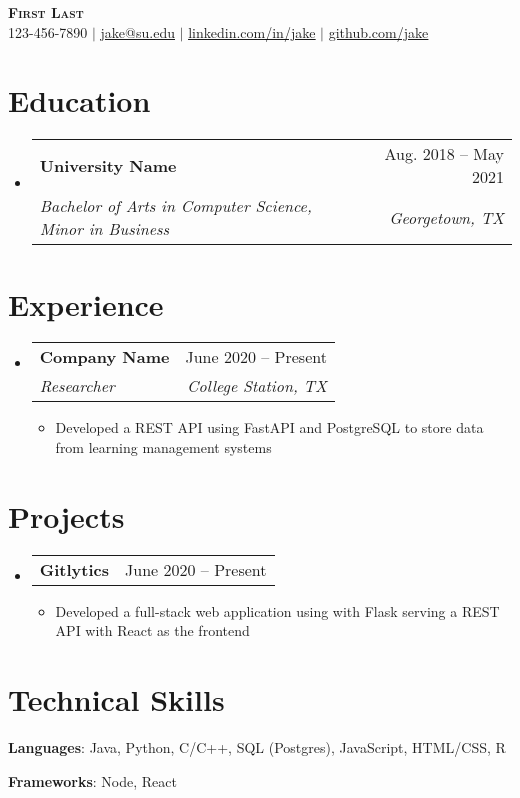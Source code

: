 \documentclass[letterpaper,12pt]{extarticle}
\makeatletter
\newcommand{\resumeItem}[1]{
  \item\small{
    {#1 \vspace{-2pt}}
  }
}
\newcommand{\resumeSubheading}[4]{
  \vspace{-1pt}\item
    \begin{tabular*}{0.97\textwidth}[t]{l@{\extracolsep{\fill}}r}
      \textbf{#1} & \footnotesize #2 \\
      \textit{\small #3} & \textit{\footnotesize #4} \\
    \end{tabular*}\vspace{-7pt}
}
\newcommand{\resumeProjectHeading}[2]{
    \item
    \begin{tabular*}{0.97\textwidth}{l@{\extracolsep{\fill}}r}
      \textbf{#1} & \small #2 \\
    \end{tabular*}\vspace{-7pt}
}
\newcommand{\resumeSubHeadingListStart}{\begin{itemize}[leftmargin=0.15in, label={}]}
\newcommand{\resumeSubHeadingListEnd}{\end{itemize}}
\newcommand{\resumeItemListStart}{
    \begin{itemize}
    \itemsep 2pt
}
\newcommand{\resumeItemListEnd}{\end{itemize}\vspace{-5pt}}
\makeatother
\begin{document}
\begin{center}
	\textbf{\Huge \scshape First Last} \\ \vspace{1pt}
	\small 123-456-7890 $|$ \href{mailto:x@x.com}{\underline{jake@su.edu}} $|$
	\href{https://linkedin.com/in/...}{\underline{linkedin.com/in/jake}} $|$
	\href{https://github.com/...}{\underline{github.com/jake}}
\end{center}


\section{Education}
\resumeSubHeadingListStart
\resumeSubheading
{University Name}{Aug. 2018 -- May 2021}
{Bachelor of Arts in Computer Science, Minor in Business}{Georgetown, TX}
\resumeSubHeadingListEnd

\section{Experience}
\resumeSubHeadingListStart
\resumeSubheading
{Company Name}{June 2020 -- Present}
{Researcher}{College Station, TX}
\resumeItemListStart
\resumeItem{Developed a REST API using FastAPI and PostgreSQL to store data from learning management systems}
\resumeItemListEnd
\resumeSubHeadingListEnd


\section{Projects}
\resumeSubHeadingListStart
\resumeProjectHeading
{\textbf{Gitlytics}}{June 2020 -- Present}
\resumeItemListStart
\resumeItem{Developed a full-stack web application using with Flask serving a REST API with React as the frontend}
\resumeItemListEnd
\resumeSubHeadingListEnd



\section{Technical Skills}
\begin{itemize}[leftmargin=0.15in, label={}]
	\itemsep -2pt
	\small{\item{
		\textbf{Languages}{: Java, Python, C/C++, SQL (Postgres), JavaScript, HTML/CSS, R} \\
	}}
	\small{\item{
		\textbf{Frameworks}{: Node, React} \\
	}}
\end{itemize}

\end{document}
